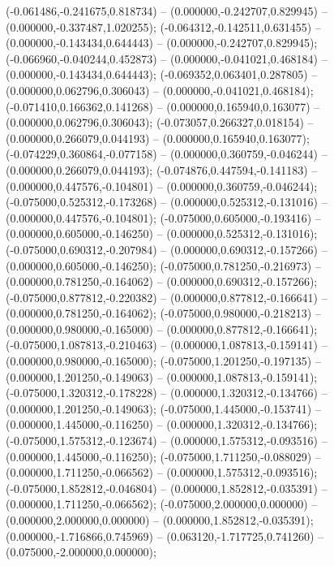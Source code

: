  (-0.061486,-0.241675,0.818734) -- (0.000000,-0.242707,0.829945) -- (0.000000,-0.337487,1.020255);
 (-0.064312,-0.142511,0.631455) -- (0.000000,-0.143434,0.644443) -- (0.000000,-0.242707,0.829945);
 (-0.066960,-0.040244,0.452873) -- (0.000000,-0.041021,0.468184) -- (0.000000,-0.143434,0.644443);
 (-0.069352,0.063401,0.287805) -- (0.000000,0.062796,0.306043) -- (0.000000,-0.041021,0.468184);
 (-0.071410,0.166362,0.141268) -- (0.000000,0.165940,0.163077) -- (0.000000,0.062796,0.306043);
 (-0.073057,0.266327,0.018154) -- (0.000000,0.266079,0.044193) -- (0.000000,0.165940,0.163077);
 (-0.074229,0.360864,-0.077158) -- (0.000000,0.360759,-0.046244) -- (0.000000,0.266079,0.044193);
 (-0.074876,0.447594,-0.141183) -- (0.000000,0.447576,-0.104801) -- (0.000000,0.360759,-0.046244);
 (-0.075000,0.525312,-0.173268) -- (0.000000,0.525312,-0.131016) -- (0.000000,0.447576,-0.104801);
 (-0.075000,0.605000,-0.193416) -- (0.000000,0.605000,-0.146250) -- (0.000000,0.525312,-0.131016);
 (-0.075000,0.690312,-0.207984) -- (0.000000,0.690312,-0.157266) -- (0.000000,0.605000,-0.146250);
 (-0.075000,0.781250,-0.216973) -- (0.000000,0.781250,-0.164062) -- (0.000000,0.690312,-0.157266);
 (-0.075000,0.877812,-0.220382) -- (0.000000,0.877812,-0.166641) -- (0.000000,0.781250,-0.164062);
 (-0.075000,0.980000,-0.218213) -- (0.000000,0.980000,-0.165000) -- (0.000000,0.877812,-0.166641);
 (-0.075000,1.087813,-0.210463) -- (0.000000,1.087813,-0.159141) -- (0.000000,0.980000,-0.165000);
 (-0.075000,1.201250,-0.197135) -- (0.000000,1.201250,-0.149063) -- (0.000000,1.087813,-0.159141);
 (-0.075000,1.320312,-0.178228) -- (0.000000,1.320312,-0.134766) -- (0.000000,1.201250,-0.149063);
 (-0.075000,1.445000,-0.153741) -- (0.000000,1.445000,-0.116250) -- (0.000000,1.320312,-0.134766);
 (-0.075000,1.575312,-0.123674) -- (0.000000,1.575312,-0.093516) -- (0.000000,1.445000,-0.116250);
 (-0.075000,1.711250,-0.088029) -- (0.000000,1.711250,-0.066562) -- (0.000000,1.575312,-0.093516);
 (-0.075000,1.852812,-0.046804) -- (0.000000,1.852812,-0.035391) -- (0.000000,1.711250,-0.066562);
 (-0.075000,2.000000,0.000000) -- (0.000000,2.000000,0.000000) -- (0.000000,1.852812,-0.035391);
 (0.000000,-1.716866,0.745969) -- (0.063120,-1.717725,0.741260) -- (0.075000,-2.000000,0.000000);
